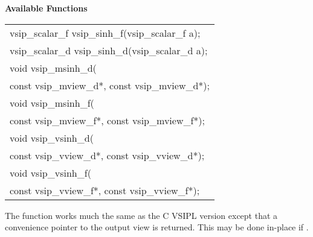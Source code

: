 \cvsiplh
\newline \hspace*{.8cm} \vspace*{.1cm} \textbf{Available Functions }
\newline \hspace*{1.1cm} {
\ttfamily
\begin{tabular}[H]{l}
vsip\_scalar\_f vsip\_sinh\_f(vsip\_scalar\_f a);\\
vsip\_scalar\_d vsip\_sinh\_d(vsip\_scalar\_d a);\\
void vsip\_msinh\_d(\\*
\hspace{1cm}const vsip\_mview\_d*, const vsip\_mview\_d*);\\
void vsip\_msinh\_f(\\*
\hspace{1cm}const vsip\_mview\_f*, const vsip\_mview\_f*);\\
void vsip\_vsinh\_d(\\*
\hspace{1cm}const vsip\_vview\_d*, const vsip\_vview\_d*);\\
void vsip\_vsinh\_f(\\*
\hspace{1cm}const vsip\_vview\_f*, const vsip\_vview\_f*);\\
\end{tabular}
}
\pyjvsiph
{}
\newline\hspace*{1.2cm}\parbox{10.8cm}{\vspace*{.1cm}The  function works much the same as the C VSIPL version except that a convenience pointer to the output view is returned. This may be done in-place if .}
